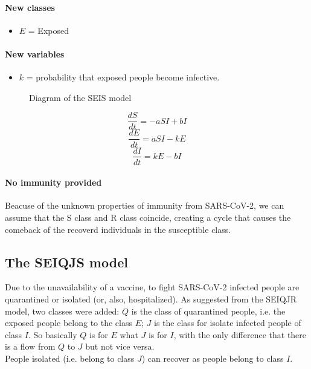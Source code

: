 \documentclass[12pt]{llncs}
\begin{document}
\paragraph{New classes}
\begin{itemize}
\item $E$ = Exposed
\end{itemize}

\paragraph{New variables}
\begin{itemize}
\item $k$ = probability that exposed people become infective.
\end{itemize}

\begin{figure}
	\centering
    \caption{Diagram of the SEIS model}
\end{figure}

$$\frac{dS}{dt} = -aSI + bI$$
$$\frac{dE}{dt} = aSI - kE$$
$$\frac{dI}{dt} = kE - bI$$

\paragraph{\textbf{No immunity provided}}
Beacuse of the unknown properties of immunity from SARS-CoV-2, we can assume that the S class and R class coincide, creating a cycle that causes the comeback of the recoverd individuals in the susceptible class.

\subsection{The SEIQJS model}
Due to the unavailability of a vaccine, to fight SARS-CoV-2 infected people are quarantined or isolated (or, also, hospitalized). As suggested from the SEIQJR model, two classes were added: $Q$ is the class of quarantined people, i.e. the exposed people belong to the class $E$; $J$ is the class for isolate infected people of class $I$. So basically $Q$ is for $E$ what $J$ is for $I$, with the only difference that there is a flow from $Q$ to $J$ but not vice versa.\\
People isolated (i.e. belong to class $J$) can recover as people belong to class $I$.
\end{document}
